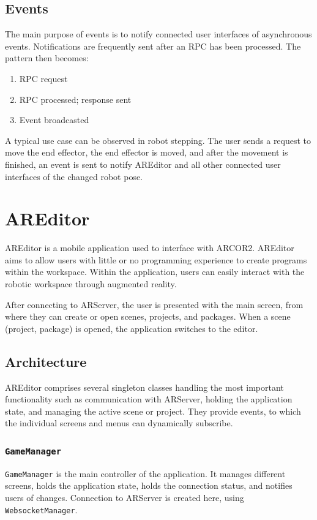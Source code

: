 \subsection{Events}
The main purpose of events is to notify connected user interfaces of asynchronous events. Notifications are frequently sent after an RPC has been processed. The pattern then becomes:
\begin{enumerate}
    \item RPC request
    \item RPC processed; response sent
    \item Event broadcasted
\end{enumerate}

A typical use case can be observed in robot stepping. The user sends a request to move the end effector, the end effector is moved, and after the movement is finished, an event is sent to notify AREditor and all other connected user interfaces of the changed robot pose.

\section{AREditor}
AREditor is a mobile application used to interface with ARCOR2. AREditor aims to allow users with little or no programming experience to create programs within the workspace. Within the application, users can easily interact with the robotic workspace through augmented reality. 

After connecting to ARServer, the user is presented with the main screen, from where they can create or open scenes, projects, and packages. When a scene (project, package) is opened, the application switches to the editor.

\subsection{Architecture}

AREditor comprises several singleton classes handling the most important functionality such as communication with ARServer, holding the application state, and managing the active scene or project. They provide events, to which the individual screens and menus can dynamically subscribe.

\subsubsection{\texttt{GameManager}}

\texttt{GameManager} is the main controller of the application. It manages different screens, holds the application state, holds the connection status, and notifies users of changes. Connection to ARServer is created here, using \texttt{WebsocketManager}. 

